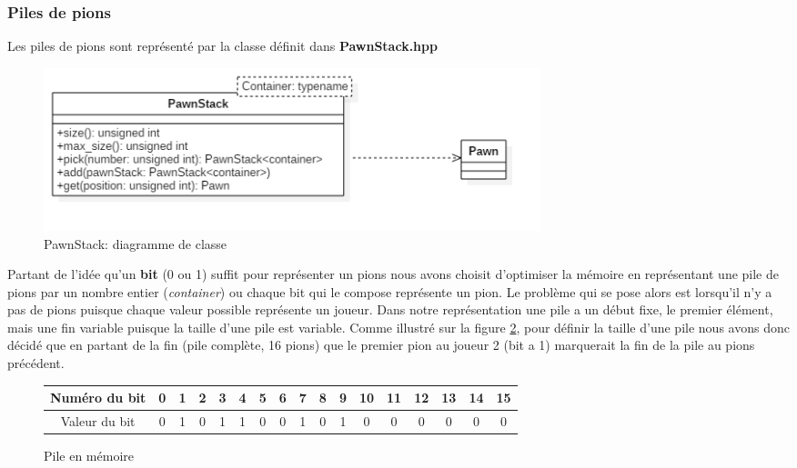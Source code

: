 \documentclass[article, backcover, french, nodocumentinfo]{upmethodology-document}
\begin{document}
			\subsubsection{Piles de pions}
					Les piles de pions sont représenté par la classe  définit dans \textbf{PawnStack.hpp}
					\begin{figure}[H]
						\centering
						\includegraphics[width=0.7\textwidth]{figures/PawnStackDiagram}
						\caption{PawnStack: diagramme de classe}
						\label{fig:PawnStackDiagram}
					\end{figure}
					Partant de l'idée qu'un \textbf{bit} (0 ou 1) suffit pour représenter un pions nous avons choisit d'optimiser la mémoire en représentant une pile de pions par un nombre entier (\textit{container}) ou chaque bit qui le compose représente un pion. Le problème qui se pose alors est lorsqu'il n'y a pas de pions puisque chaque valeur possible représente un joueur.
					Dans notre représentation une pile a un début fixe, le premier élément, mais une fin variable puisque la taille d'une pile est variable. Comme illustré sur la figure \ref{fig:pile_mémoire}, pour définir la taille d'une pile nous avons donc décidé que en partant de la fin (pile complète, 16 pions) que le premier pion au joueur 2 (bit a 1) marquerait la fin de la pile au pions précédent.
					\begin{figure}[H]
						\begin{center}
							\begin{tabular}{|c|c|c|c|c|c|c|c|c|c|c|c|c|c|c|c|c|}
								\hline
								Numéro du bit & 0 & 1 & 2 & 3 & 4 & 5 & 6 & 7 & 8 & 9 & 10 & 11 & 12 & 13 & 14 & 15\\
								\hline
								Valeur du bit & 0\cellcolor{green} & 1\cellcolor{green} & 0\cellcolor{green} & 1\cellcolor{green} & 1\cellcolor{green} & 0\cellcolor{green} & 0\cellcolor{green} & 1\cellcolor{green} & 0\cellcolor{green} & 1\cellcolor{orange} & 0\cellcolor{red} & 0\cellcolor{red} & 0\cellcolor{red} & 0\cellcolor{red} & 0\cellcolor{red} & 0\cellcolor{red}\\
								\hline
							\end{tabular}
						\end{center}
						\caption{Pile en mémoire}
						\label{fig:pile_mémoire}
					\end{figure}
\end{document}
